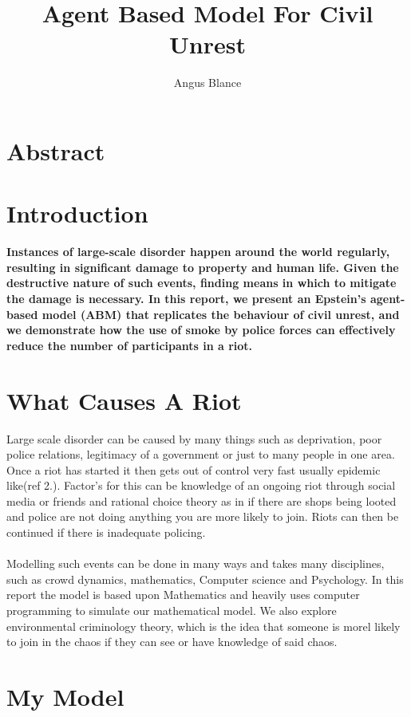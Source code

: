 \documentclass[11pt]{article}
\author{Angus Blance}
\title{Agent Based Model For Civil Unrest}
\begin{document}
	\maketitle
	\tableofcontents
	\newpage
	\section{Abstract}
	\section{Introduction}
	\textbf{Instances of large-scale disorder happen around the world regularly, resulting in significant damage to property and human life. Given the destructive nature of such events, finding means in which to mitigate the damage is necessary. In this report, we present an Epstein's agent-based model (ABM) that replicates the behaviour of civil unrest, and we demonstrate how the use of smoke by police forces can effectively reduce the number of participants in a riot.}
	
	\section*{What Causes A Riot}
	 Large scale disorder can be caused by many things such as deprivation, poor police relations, legitimacy of a government or just to many people in one area. Once a riot has started it then gets out of control very fast usually epidemic like(ref 2.). Factor's for this can be knowledge of an ongoing riot through social media or friends and rational choice theory as in if there are shops being looted and police are not doing anything you are more likely to join. Riots can then be continued if there is inadequate policing.\\
	 \\	
	 Modelling such events can be done in many ways and takes many disciplines, such as crowd dynamics, mathematics, Computer science and Psychology. In this report the model is based upon Mathematics and heavily uses computer programming to simulate our mathematical model. We also explore environmental criminology theory, which is the idea that someone is morel likely to join in the chaos if they can see or have knowledge of said chaos.
	
	\section{My Model}
\end{document}
